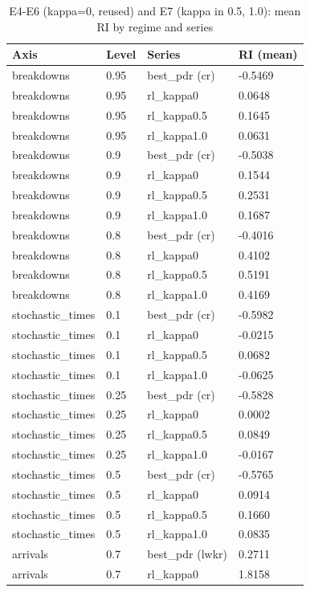 \begin{table}[htbp]
\centering
\caption{E4-E6 (kappa=0, reused) and E7 (kappa in 0.5, 1.0): mean RI by regime and series}
\label{tab:ch6-e4e5e6e7-ri-summary}
\begin{tabular}{llll}
\toprule
Axis & Level & Series & RI (mean) \\
\midrule
breakdowns & 0.95 & best\_pdr (cr) & -0.5469 \\
breakdowns & 0.95 & rl\_kappa0 & 0.0648 \\
breakdowns & 0.95 & rl\_kappa0.5 & 0.1645 \\
breakdowns & 0.95 & rl\_kappa1.0 & 0.0631 \\
breakdowns & 0.9 & best\_pdr (cr) & -0.5038 \\
breakdowns & 0.9 & rl\_kappa0 & 0.1544 \\
breakdowns & 0.9 & rl\_kappa0.5 & 0.2531 \\
breakdowns & 0.9 & rl\_kappa1.0 & 0.1687 \\
breakdowns & 0.8 & best\_pdr (cr) & -0.4016 \\
breakdowns & 0.8 & rl\_kappa0 & 0.4102 \\
breakdowns & 0.8 & rl\_kappa0.5 & 0.5191 \\
breakdowns & 0.8 & rl\_kappa1.0 & 0.4169 \\
stochastic\_times & 0.1 & best\_pdr (cr) & -0.5982 \\
stochastic\_times & 0.1 & rl\_kappa0 & -0.0215 \\
stochastic\_times & 0.1 & rl\_kappa0.5 & 0.0682 \\
stochastic\_times & 0.1 & rl\_kappa1.0 & -0.0625 \\
stochastic\_times & 0.25 & best\_pdr (cr) & -0.5828 \\
stochastic\_times & 0.25 & rl\_kappa0 & 0.0002 \\
stochastic\_times & 0.25 & rl\_kappa0.5 & 0.0849 \\
stochastic\_times & 0.25 & rl\_kappa1.0 & -0.0167 \\
stochastic\_times & 0.5 & best\_pdr (cr) & -0.5765 \\
stochastic\_times & 0.5 & rl\_kappa0 & 0.0914 \\
stochastic\_times & 0.5 & rl\_kappa0.5 & 0.1660 \\
stochastic\_times & 0.5 & rl\_kappa1.0 & 0.0835 \\
arrivals & 0.7 & best\_pdr (lwkr) & 0.2711 \\
arrivals & 0.7 & rl\_kappa0 & 1.8158 \\

\end{tabular}
\end{table}
